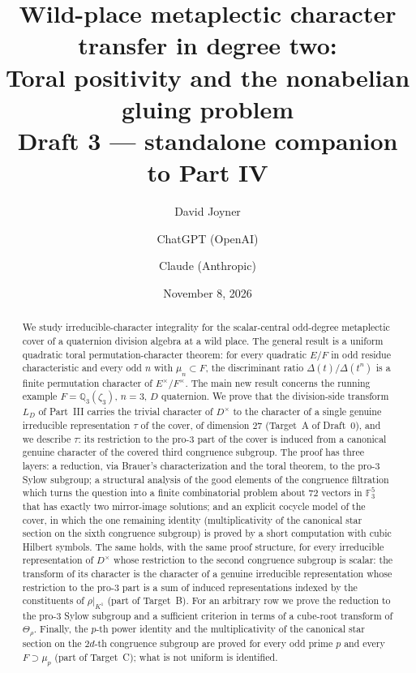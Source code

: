 \documentclass[11pt]{article}
\title{Wild-place metaplectic character transfer in degree two:\\
Toral positivity and the nonabelian gluing problem\\[0.4em]
\normalsize Draft 3 --- standalone companion to Part IV}
\author{David Joyner \and ChatGPT (OpenAI) \and Claude (Anthropic)}
\date{November 8, 2026}
\newcommand{\Q}{\mathbb Q}
\newcommand{\Fq}{\mathbb F}
\theoremstyle{plain}
\theoremstyle{definition}
\begin{document}
\maketitle
\begin{abstract}
We study irreducible-character integrality for the scalar-central
odd-degree metaplectic cover of a quaternion division algebra at a
wild place.  The general result is a uniform quadratic toral
permutation-character theorem: for every quadratic $E/F$ in odd
residue characteristic and every odd $n$ with $\mu_n\subset F$, the
discriminant ratio $\Delta(t)/\Delta(t^n)$ is a finite permutation
character of $E^\times/F^\times$.  The main new result concerns the
running example $F=\Q_3(\zeta_3)$, $n=3$, $D$ quaternion.  We prove
that the division-side transform $L_D$ of Part~III carries the
trivial character of $D^\times$ to the character of a single genuine
irreducible representation $\tau$ of the cover, of dimension $27$
(Target~A of Draft~0), and we describe $\tau$: its restriction to the
pro-$3$ part of the cover is induced from a canonical genuine
character of the covered third congruence subgroup.  The proof has
three layers: a reduction, via Brauer's characterization and the
toral theorem, to the pro-$3$ Sylow subgroup; a structural analysis
of the good elements of the congruence filtration which turns the
question into a finite combinatorial problem about $72$ vectors in
$\Fq_3^5$ that has exactly two mirror-image solutions; and an
explicit cocycle model of the cover, in which the one remaining
identity (multiplicativity of the canonical star section on the sixth
congruence subgroup) is proved by a short computation with cubic
Hilbert symbols.  The same holds, with the same proof structure, for every
irreducible representation of $D^\times$ whose restriction to the second
congruence subgroup is scalar: the transform of its character is the
character of a genuine irreducible representation whose restriction to
the pro-$3$ part is a sum of induced representations indexed by the
constituents of $\rho|_{K^1}$ (part of Target~B).  For an arbitrary row
we prove the reduction to the pro-$3$ Sylow subgroup and a sufficient
criterion in terms of a cube-root transform of $\Theta_\rho$.  Finally,
the $p$-th power identity and the multiplicativity of the canonical star
section on the $2d$-th congruence subgroup are proved for every odd prime
$p$ and every $F\supset\mu_p$ (part of Target~C); what is not uniform is
identified.
\end{abstract}
\tableofcontents
\end{document}
